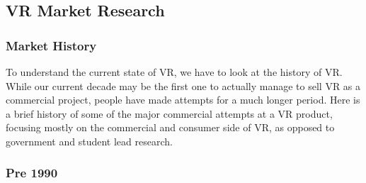 \documentclass[a4paper,10pt]{article}
\begin{document}
\subsection{VR Market Research}
\subsubsection{Market History}
To understand the current state of VR, we have to look at the history of VR.  While our current decade may be the first one to actually manage to sell VR as a commercial project, people have made attempts for a much longer period.  Here is a brief history of some of the major commercial attempts at a VR product, focusing mostly on the commercial and consumer side of VR, as opposed to government and student lead research.

\subsubsection{Pre 1990}
	
\end{document}
